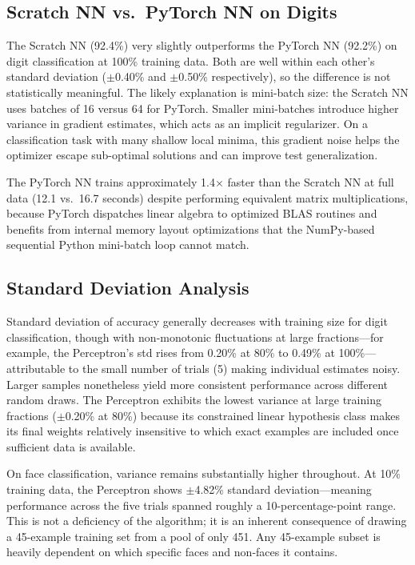 \documentclass[12pt]{article}
\begin{document}
\subsection{Scratch NN vs.\ PyTorch NN on Digits}

The Scratch NN (92.4\%) very slightly outperforms the PyTorch NN (92.2\%) on digit
classification at 100\% training data. Both are well within each other's standard
deviation ($\pm$0.40\% and $\pm$0.50\% respectively), so the difference is not
statistically meaningful. The likely explanation is mini-batch size: the Scratch NN uses
batches of 16 versus 64 for PyTorch. Smaller mini-batches introduce higher variance in
gradient estimates, which acts as an implicit regularizer. On a classification task with
many shallow local minima, this gradient noise helps the optimizer escape sub-optimal
solutions and can improve test generalization.

The PyTorch NN trains approximately 1.4$\times$ faster than the Scratch NN at full data
(12.1 vs.\ 16.7 seconds) despite performing equivalent matrix multiplications, because
PyTorch dispatches linear algebra to optimized BLAS routines and benefits from internal
memory layout optimizations that the NumPy-based sequential Python mini-batch loop
cannot match.

\subsection{Standard Deviation Analysis}

Standard deviation of accuracy generally decreases with training size for digit
classification, though with non-monotonic fluctuations at large fractions---for example,
the Perceptron's std rises from 0.20\% at 80\% to 0.49\% at 100\%---attributable to
the small number of trials (5) making individual estimates noisy. Larger samples
nonetheless yield more consistent performance across different random draws.
The Perceptron exhibits the lowest variance at large
training fractions ($\pm$0.20\% at 80\%) because its constrained linear hypothesis class
makes its final weights relatively insensitive to which exact examples are included once
sufficient data is available.

On face classification, variance remains substantially higher throughout. At 10\% training
data, the Perceptron shows $\pm$4.82\% standard deviation---meaning performance across
the five trials spanned roughly a 10-percentage-point range. This is not a deficiency of
the algorithm; it is an inherent consequence of drawing a 45-example training set from a
pool of only 451. Any 45-example subset is heavily dependent on which specific faces and
non-faces it contains.
\end{document}

